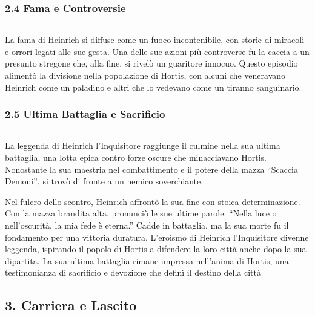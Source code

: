 \subsubsection{\texorpdfstring{2.4 \textbf{Fama e
Controversie}}{2.4 Fama e Controversie}}\label{fama-e-controversie}

\begin{center}\rule{0.5\linewidth}{0.5pt}\end{center}

La fama di Heinrich si diffuse come un fuoco incontenibile, con storie
di miracoli e orrori legati alle sue gesta. Una delle sue azioni più
controverse fu la caccia a un presunto stregone che, alla fine, si
rivelò un guaritore innocuo. Questo episodio alimentò la divisione nella
popolazione di Hortis, con alcuni che veneravano Heinrich come un
paladino e altri che lo vedevano come un tiranno sanguinario.

\subsubsection{\texorpdfstring{2.5 \textbf{Ultima Battaglia e
Sacrificio}}{2.5 Ultima Battaglia e Sacrificio}}\label{ultima-battaglia-e-sacrificio}

\begin{center}\rule{0.5\linewidth}{0.5pt}\end{center}

La leggenda di Heinrich l'Inquisitore raggiunge il culmine nella sua
ultima battaglia, una lotta epica contro forze oscure che minacciavano
Hortis. Nonostante la sua maestria nel combattimento e il potere della
mazza ``Scaccia Demoni'', si trovò di fronte a un nemico soverchiante.

Nel fulcro dello scontro, Heinrich affrontò la sua fine con stoica
determinazione. Con la mazza brandita alta, pronunciò le sue ultime
parole: ``Nella luce o nell'oscurità, la mia fede è eterna.'' Cadde in
battaglia, ma la sua morte fu il fondamento per una vittoria duratura.
L'eroismo di Heinrich l'Inquisitore divenne leggenda, ispirando il
popolo di Hortis a difendere la loro città anche dopo la sua dipartita.
La sua ultima battaglia rimane impressa nell'anima di Hortis, una
testimonianza di sacrificio e devozione che definì il destino della
città

\subsection{3. Carriera e Lascito}\label{carriera-e-lascito}

